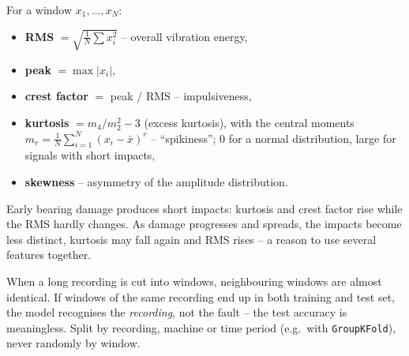 \documentclass[
  letterpaper,
  DIV=11,
  numbers=noendperiod]{scrreprt}
\providecommand{\tightlist}{%
  \setlength{\itemsep}{0pt}\setlength{\parskip}{0pt}}\usepackage{longtable,booktabs,array}
\begin{document}
\begin{tcolorbox}[enhanced jigsaw, left=2mm, title=\textcolor{quarto-callout-note-color}{\faInfo}\hspace{0.5em}{Definition: Common time-domain features}, opacityback=0, breakable, rightrule=.15mm, arc=.35mm, toptitle=1mm, colbacktitle=quarto-callout-note-color!10!white, opacitybacktitle=0.6, coltitle=black, colframe=quarto-callout-note-color-frame, bottomrule=.15mm, leftrule=.75mm, bottomtitle=1mm, titlerule=0mm, toprule=.15mm, colback=white]

For a window \(x_1, \dots, x_N\):

\begin{itemize}
\tightlist
\item
  \textbf{RMS} \(= \sqrt{\frac{1}{N}\sum x_i^2}\) -- overall vibration
  energy,
\item
  \textbf{peak} \(= \max |x_i|\),
\item
  \textbf{crest factor} \(=\) peak / RMS -- impulsiveness,
\item
  \textbf{kurtosis} \(= m_4/m_2^2 - 3\) (excess kurtosis), with the
  central moments \(m_r = \frac1N\sum_{i=1}^N (x_i - \bar x)^r\) --
  ``spikiness''; 0 for a normal distribution, large for signals with
  short impacts,
\item
  \textbf{skewness} -- asymmetry of the amplitude distribution.
\end{itemize}

\end{tcolorbox}

Early bearing damage produces short impacts: kurtosis and crest factor
rise while the RMS hardly changes. As damage progresses and spreads, the
impacts become less distinct, kurtosis may fall again and RMS rises -- a
reason to use several features together.

\begin{tcolorbox}[enhanced jigsaw, left=2mm, title=\textcolor{quarto-callout-warning-color}{\faExclamationTriangle}\hspace{0.5em}{Pitfall: splitting windows of the same recording}, opacityback=0, breakable, rightrule=.15mm, arc=.35mm, toptitle=1mm, colbacktitle=quarto-callout-warning-color!10!white, opacitybacktitle=0.6, coltitle=black, colframe=quarto-callout-warning-color-frame, bottomrule=.15mm, leftrule=.75mm, bottomtitle=1mm, titlerule=0mm, toprule=.15mm, colback=white]

When a long recording is cut into windows, neighbouring windows are
almost identical. If windows of the same recording end up in both
training and test set, the model recognises the \emph{recording}, not
the fault -- the test accuracy is meaningless. Split by recording,
machine or time period (e.g.~with \texttt{GroupKFold}), never randomly
by window.

\end{tcolorbox}
\end{document}
